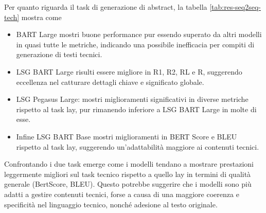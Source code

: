 \documentclass[12pt,a4paper,twoside,openright]{book}
\begin{document}
Per quanto riguarda il task di generazione di abstract, la tabella \ref{tab:res-seq2seq-tech} mostra come 
\begin{itemize}
    \item BART Large mostri buone performance pur essendo superato da altri modelli in quasi tutte le metriche, indicando una possibile inefficacia per compiti di generazione di testi tecnici.
    \item LSG BART Large risulti essere migliore in R1, R2, RL e R, suggerendo eccellenza nel catturare dettagli chiave e significato globale.
    \item LSG Pegasus Large: mostri miglioramenti significativi in diverse metriche rispetto al task lay, pur rimanendo inferiore a LSG BART Large in molte di esse.
    \item Infine LSG BART Base mostri miglioramenti in BERT Score e BLEU rispetto al task lay, suggerendo un'adattabilità maggiore ai contenuti tecnici.
\end{itemize}

Confrontando i due task emerge come i modelli tendano a mostrare prestazioni leggermente migliori sul task tecnico rispetto a quello lay in termini di qualità generale (BertScore, BLEU). Questo potrebbe suggerire che i modelli sono più adatti a gestire contenuti tecnici, forse a causa di una maggiore coerenza e specificità nel linguaggio tecnico, nonché adesione al testo originale.
\end{document}
